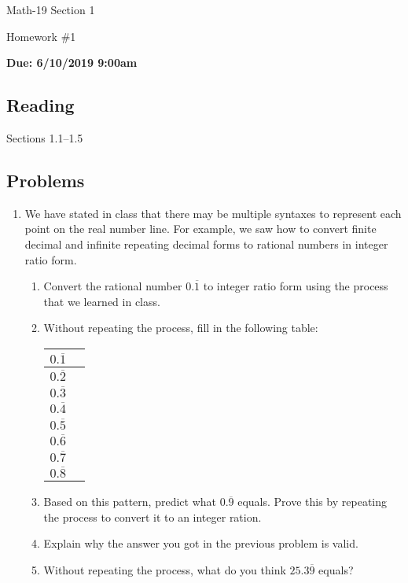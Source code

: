 \documentclass[letterpaper,12pt,fleqn]{article}
\begin{document}
\begin{center}
  \large
  Math-19 Section 1

  \Large
  Homework \#1

  \large
  \textbf{Due: 6/10/2019 9:00am}
\end{center}

\subsection*{Reading}

Sections 1.1--1.5

\subsection*{Problems}

\begin{enumerate}
\item We have stated in class that there may be multiple syntaxes to represent each point on the real number line.
  For example, we saw how to convert finite decimal and infinite repeating decimal forms to rational numbers in
  integer ratio form.
  \begin{enumerate}
  \item Convert the rational number \(0.\overline{1}\) to integer ratio form using the process that we learned in
    class.
  \item Without repeating the process, fill in the following table:
    
    \renewcommand{\arraystretch}{2}
    \begin{tabular}{|c|p{0.5in}|}
      \hline
      \(0.\overline{1}\) & \\
      \hline
      \(0.\overline{2}\) & \\
      \hline
      \(0.\overline{3}\) & \\
      \hline
      \(0.\overline{4}\) & \\
      \hline
      \(0.\overline{5}\) & \\
      \hline
      \(0.\overline{6}\) & \\
      \hline
      \(0.\overline{7}\) & \\
      \hline
      \(0.\overline{8}\) & \\
      \hline
    \end{tabular}

  \item Based on this pattern, predict what \(0.\overline{9}\) equals.  Prove this by repeating the process to
    convert it to an integer ration.
  \item Explain why the answer you got in the previous problem is valid.
  \item Without repeating the process, what do you think \(25.3\overline{9}\) equals?
  \end{enumerate}


\end{enumerate}
\end{document}
